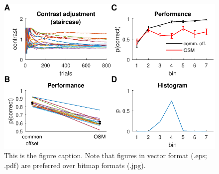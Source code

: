 \begin{figure}[t]
\centering
\includegraphics[width=1\textwidth]{Figures/resultspdf}
\caption{This is the figure caption. Note that figures in vector format (.eps; .pdf) are preferred over bitmap formats (.jpg).}
\label{samplefig}
\end{figure}
